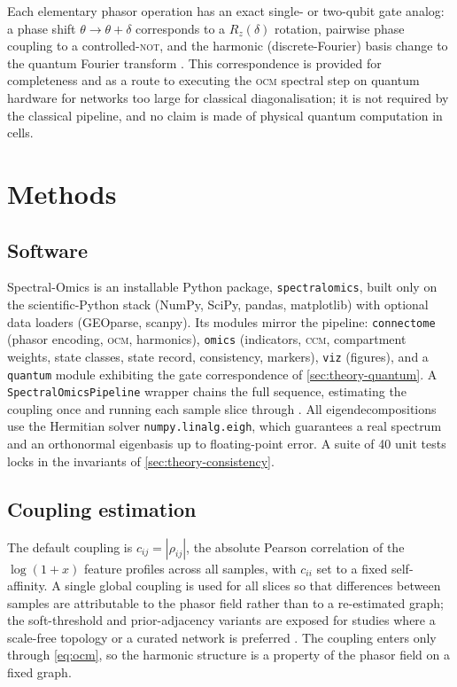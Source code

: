 \documentclass[preprint,12pt,amsmath,amssymb,superscriptaddress,floatfix]{revtex4-2}
\theoremstyle{definition}
\theoremstyle{plain}
\newcommand{\OCM}{\textsc{ocm}}
\newcommand{\CCM}{\textsc{ccm}}
\begin{document}
Each elementary phasor operation has an exact single- or two-qubit gate analog:
a phase shift $\theta\to\theta+\delta$ corresponds to a $R_z(\delta)$ rotation,
pairwise phase coupling to a controlled-\textsc{not}, and the harmonic
(discrete-Fourier) basis change to the quantum Fourier transform
\citep{nielsen2010quantum}. This correspondence is provided for completeness and
as a route to executing the \OCM{} spectral step on quantum hardware for
networks too large for classical diagonalisation; it is not required by the
classical pipeline, and no claim is made of physical quantum computation in
cells.

\section{Methods}
\label{sec:methods}

\subsection{Software}

Spectral-Omics is an installable Python package, \texttt{spectralomics}, built
only on the scientific-Python stack (NumPy, SciPy, pandas, matplotlib) with
optional data loaders (GEOparse, scanpy). Its modules mirror the pipeline:
\texttt{connectome} (phasor encoding, \OCM, harmonics), \texttt{omics}
(indicators, \CCM, compartment weights, state classes, state record, consistency, markers),
\texttt{viz} (figures), and a \texttt{quantum} module exhibiting the gate
correspondence of \cref{sec:theory-quantum}. A \texttt{SpectralOmicsPipeline}
wrapper chains the full sequence, estimating the coupling once and running each
sample slice through . All eigendecompositions use the
Hermitian solver \texttt{numpy.linalg.eigh}, which guarantees a real spectrum and
an orthonormal eigenbasis up to floating-point error. A suite of 40 unit tests
locks in the invariants of \cref{sec:theory-consistency}.

\subsection{Coupling estimation}

The default coupling is $c_{ij}=|\rho_{ij}|$, the absolute Pearson correlation of
the $\log(1+x)$ feature profiles across all samples, with $c_{ii}$ set to a
fixed self-affinity. A single global coupling is used for all slices so that
differences between samples are attributable to the phasor field rather than to a
re-estimated graph; the soft-threshold and prior-adjacency variants are exposed
for studies where a scale-free topology or a curated network is preferred
\citep{langfelder2008wgcna, barabasi2011network}. The coupling enters only
through \cref{eq:ocm}, so the harmonic structure is a property of the phasor
field on a fixed graph.
\end{document}
